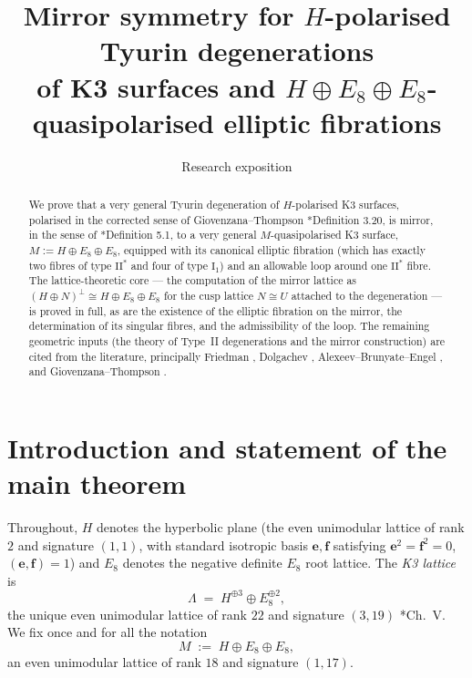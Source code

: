 \documentclass[11pt]{amsart}
\theoremstyle{plain}
\theoremstyle{definition}
\newcommand{\Lam}{\Lambda}
\newcommand{\e}{\mathbf{e}}
\newcommand{\ff}{\mathbf{f}}
\begin{document}
\title[Mirror symmetry for $H$-polarised Tyurin degenerations of K3 surfaces]
{Mirror symmetry for $H$-polarised Tyurin degenerations\\ of K3 surfaces and
$H\oplus E_8\oplus E_8$-quasipolarised elliptic fibrations}

\author{Research exposition}
\date{}

\maketitle

\begin{abstract}
We prove that a very general Tyurin degeneration of $H$-polarised K3 surfaces,
polarised in the corrected sense of Giovenzana--Thompson
\cite{dfk3slpms}*{Definition 3.20}, is mirror, in the sense of
\cite{dfk3slpms}*{Definition 5.1}, to a very general
$M$-quasipolarised K3 surface, $M := H \oplus E_8 \oplus E_8$, equipped with
its canonical elliptic fibration (which has exactly two fibres of type $\mathrm{II}^*$
and four of type $\mathrm{I}_1$) and an allowable loop around one $\mathrm{II}^*$ fibre.
The lattice-theoretic core --- the computation of the mirror lattice as
$(H\oplus N)^\perp \cong H\oplus E_8\oplus E_8$ for the cusp lattice $N\cong U$
attached to the degeneration --- is proved in full, as are the existence of the
elliptic fibration on the mirror, the determination of its singular fibres, and
the admissibility of the loop. The remaining geometric inputs
(the theory of Type~II degenerations and the mirror construction) are cited
from the literature, principally Friedman \cite{Fri83}, Dolgachev \cite{Dol96},
Alexeev--Brunyate--Engel \cite{cmek3sspt}, and Giovenzana--Thompson \cite{dfk3slpms}.
\end{abstract}

\section{Introduction and statement of the main theorem}

Throughout, $H$ denotes the hyperbolic plane (the even unimodular lattice of
rank $2$ and signature $(1,1)$, with standard isotropic basis
$\e,\ff$ satisfying $\e^2=\ff^2=0$, $(\e,\ff)=1$) and $E_8$ denotes the
negative definite $E_8$ root lattice. The \emph{K3 lattice} is
\[
\Lam \;=\; H^{\oplus 3}\oplus E_8^{\oplus 2},
\]
the unique even unimodular lattice of rank $22$ and signature $(3,19)$
\cite{Ser70}*{Ch.~V}. We fix once and for all the notation
\[
M \;:=\; H\oplus E_8\oplus E_8 ,
\]
an even unimodular lattice of rank $18$ and signature $(1,17)$.
\end{document}

